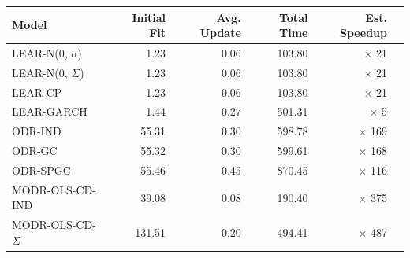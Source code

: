 \begin{tabular}{lrrrrr}
\toprule
Model & Initial Fit & Avg. Update & Total Time & Est. Speedup \\
\midrule
LEAR-N(0, $\sigma$) & {\cellcolor[HTML]{F7FBFF}} \color[HTML]{000000} 1.23 & {\cellcolor[HTML]{E7F1FA}} \color[HTML]{000000} 0.06 & {\cellcolor[HTML]{F2F8FD}} \color[HTML]{000000} 103.80 & {\cellcolor[HTML]{B5D4E9}} \color[HTML]{000000} $\times$ 21 \\
LEAR-N(0, $\Sigma$) & {\cellcolor[HTML]{F7FBFF}} \color[HTML]{000000} 1.23 & {\cellcolor[HTML]{E7F1FA}} \color[HTML]{000000} 0.06 & {\cellcolor[HTML]{F2F8FD}} \color[HTML]{000000} 103.80 & {\cellcolor[HTML]{B5D4E9}} \color[HTML]{000000} $\times$ 21 \\
LEAR-CP & {\cellcolor[HTML]{F7FBFF}} \color[HTML]{000000} 1.23 & {\cellcolor[HTML]{E7F1FA}} \color[HTML]{000000} 0.06 & {\cellcolor[HTML]{F2F8FD}} \color[HTML]{000000} 103.80 & {\cellcolor[HTML]{B5D4E9}} \color[HTML]{000000} $\times$ 21 \\
LEAR-GARCH & {\cellcolor[HTML]{F3F8FE}} \color[HTML]{000000} 1.44 & {\cellcolor[HTML]{89BEDC}} \color[HTML]{000000} 0.27 & {\cellcolor[HTML]{A1CBE2}} \color[HTML]{000000} 501.31 & {\cellcolor[HTML]{F7FBFF}} \color[HTML]{000000} $\times$ 5 \\
ODR-IND & {\cellcolor[HTML]{6AAED6}} \color[HTML]{F1F1F1} 55.31 & {\cellcolor[HTML]{82BBDB}} \color[HTML]{000000} 0.30 & {\cellcolor[HTML]{92C4DE}} \color[HTML]{000000} 598.78 & {\cellcolor[HTML]{2272B6}} \color[HTML]{F1F1F1} $\times$ 169 \\
ODR-GC & {\cellcolor[HTML]{6AAED6}} \color[HTML]{F1F1F1} 55.32 & {\cellcolor[HTML]{82BBDB}} \color[HTML]{000000} 0.30 & {\cellcolor[HTML]{92C4DE}} \color[HTML]{000000} 599.61 & {\cellcolor[HTML]{2272B6}} \color[HTML]{F1F1F1} $\times$ 168 \\
ODR-SPGC & {\cellcolor[HTML]{6AAED6}} \color[HTML]{F1F1F1} 55.46 & {\cellcolor[HTML]{60A7D2}} \color[HTML]{F1F1F1} 0.45 & {\cellcolor[HTML]{71B1D7}} \color[HTML]{F1F1F1} 870.45 & {\cellcolor[HTML]{3787C0}} \color[HTML]{F1F1F1} $\times$ 116 \\
MODR-OLS-CD-IND & {\cellcolor[HTML]{7DB8DA}} \color[HTML]{000000} 39.08 & {\cellcolor[HTML]{D6E6F4}} \color[HTML]{000000} 0.08 & {\cellcolor[HTML]{D8E7F5}} \color[HTML]{000000} 190.40 & {\cellcolor[HTML]{08478D}} \color[HTML]{F1F1F1} $\times$ 375 \\
MODR-OLS-CD-$\Sigma$ & {\cellcolor[HTML]{4594C7}} \color[HTML]{F1F1F1} 131.51 & {\cellcolor[HTML]{A4CCE3}} \color[HTML]{000000} 0.20 & {\cellcolor[HTML]{A3CCE3}} \color[HTML]{000000} 494.41 & {\cellcolor[HTML]{083877}} \color[HTML]{F1F1F1} $\times$ 487 \\

\end{tabular}
